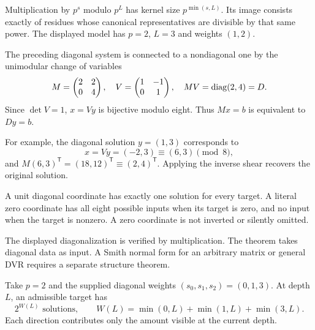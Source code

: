 Multiplication by $p^s$ modulo $p^L$ has kernel size $p^{\min(s,L)}$. Its image consists exactly of residues whose canonical representatives are divisible by that same power. The displayed model has $p=2$, $L=3$ and weights $(1,2)$.


The preceding diagonal system is connected to a nondiagonal one by the unimodular change of variables
\[
M=\begin{pmatrix}2&2\\0&4\end{pmatrix},\quad
V=\begin{pmatrix}1&-1\\0&1\end{pmatrix},\quad
MV=\operatorname{diag}(2,4)=D.
\]
Since $\det V=1$, $x=Vy$ is bijective modulo eight. Thus $Mx=b$ is equivalent to $Dy=b$.


For example, the diagonal solution $y=(1,3)$ corresponds to
\[
x=Vy=(-2,3)\equiv(6,3)\pmod8,
\]
and $M(6,3)^\mathsf T=(18,12)^\mathsf T\equiv(2,4)^\mathsf T$. Applying the inverse shear recovers the original solution.

A unit diagonal coordinate has exactly one solution for every target. A literal zero coordinate has all eight possible inputs when its target is zero, and no input when the target is nonzero. A zero coordinate is not inverted or silently omitted.

The displayed diagonalization is verified by multiplication. The theorem takes diagonal data as input. A Smith normal form for an arbitrary matrix or general DVR requires a separate structure theorem.


Take $p=2$ and the supplied diagonal weights $(s_0,s_1,s_2)=(0,1,3)$. At depth $L$, an admissible target has
\[
2^{W(L)}\text{ solutions},\qquad
W(L)=\min(0,L)+\min(1,L)+\min(3,L).
\]
Each direction contributes only the amount visible at the current depth.


